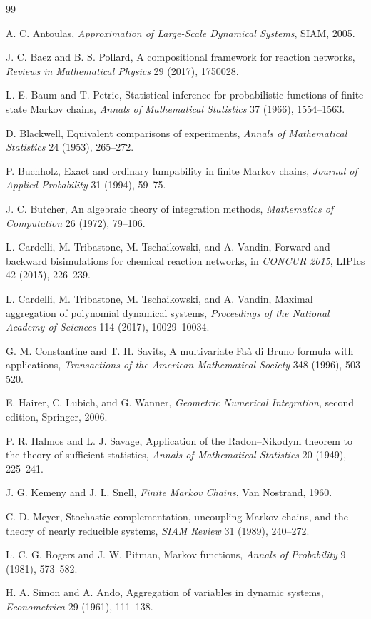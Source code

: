 \documentclass[11pt]{article}
\theoremstyle{definition}
\theoremstyle{remark}
\begin{document}
\begin{thebibliography}{99}

A. C. Antoulas,
\emph{Approximation of Large-Scale Dynamical Systems},
SIAM, 2005.

J. C. Baez and B. S. Pollard,
A compositional framework for reaction networks,
\emph{Reviews in Mathematical Physics} 29 (2017), 1750028.

L. E. Baum and T. Petrie,
Statistical inference for probabilistic functions of finite state Markov chains,
\emph{Annals of Mathematical Statistics} 37 (1966), 1554--1563.

D. Blackwell,
Equivalent comparisons of experiments,
\emph{Annals of Mathematical Statistics} 24 (1953), 265--272.

P. Buchholz,
Exact and ordinary lumpability in finite Markov chains,
\emph{Journal of Applied Probability} 31 (1994), 59--75.

J. C. Butcher,
An algebraic theory of integration methods,
\emph{Mathematics of Computation} 26 (1972), 79--106.

L. Cardelli, M. Tribastone, M. Tschaikowski, and A. Vandin,
Forward and backward bisimulations for chemical reaction networks,
in \emph{CONCUR 2015}, LIPIcs 42 (2015), 226--239.

L. Cardelli, M. Tribastone, M. Tschaikowski, and A. Vandin,
Maximal aggregation of polynomial dynamical systems,
\emph{Proceedings of the National Academy of Sciences} 114 (2017), 10029--10034.

G. M. Constantine and T. H. Savits,
A multivariate Fa\`a di Bruno formula with applications,
\emph{Transactions of the American Mathematical Society} 348 (1996), 503--520.

E. Hairer, C. Lubich, and G. Wanner,
\emph{Geometric Numerical Integration}, second edition,
Springer, 2006.

P. R. Halmos and L. J. Savage,
Application of the Radon--Nikodym theorem to the theory of sufficient statistics,
\emph{Annals of Mathematical Statistics} 20 (1949), 225--241.

J. G. Kemeny and J. L. Snell,
\emph{Finite Markov Chains},
Van Nostrand, 1960.

C. D. Meyer,
Stochastic complementation, uncoupling Markov chains, and the theory of nearly reducible systems,
\emph{SIAM Review} 31 (1989), 240--272.

L. C. G. Rogers and J. W. Pitman,
Markov functions,
\emph{Annals of Probability} 9 (1981), 573--582.

H. A. Simon and A. Ando,
Aggregation of variables in dynamic systems,
\emph{Econometrica} 29 (1961), 111--138.

\end{thebibliography}
\end{document}
